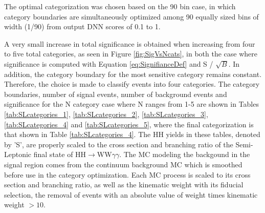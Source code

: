 
The optimal categorization was chosen based on the 90 bin case, in which category boundaries are simultaneously optimized among 90 equally sized bins of width (1/90) from output DNN scores 
of 0.1 to 1. 



A very small increase in total significance is obtained when increasing from four to five total categories, as seen in Figure \ref{fig:SigVsNcats}, in both the case where significance is computed with Equation \ref{eq:SignifianceDef}
and S / $\sqrt{B}$. In addition, the category boundary 
for the most sensitive category remains constant. Therefore, the choice is made to classify events into four categories. The category boundaries, number of signal events, number of background 
events and significance for the N category case where N ranges from 1-5 are shown in Tables \ref{tab:SLcategories_1}, \ref{tab:SLcategories_2}, \ref{tab:SLcategories_3}, \ref{tab:SLcategories_4} and \ref{tab:SLcategories_5},
where the final categorization is that shown in Table \ref{tab:SLcategories_4}. The HH yields in these tables, denoted by 'S', are properly scaled to the cross section and branching ratio of 
the Semi-Leptonic final state of HH$\rightarrow$WW$\gamma\gamma$. The MC modeling the backgound in the signal region comes from the continuum background MC which is smoothed before 
use in the category optimization. Each MC process is scaled to its cross section and branching ratio, as well as the kinematic weight with its fiducial selection, the removal of events with an absolute value of weight times kinematic 
weight $> 10$.

